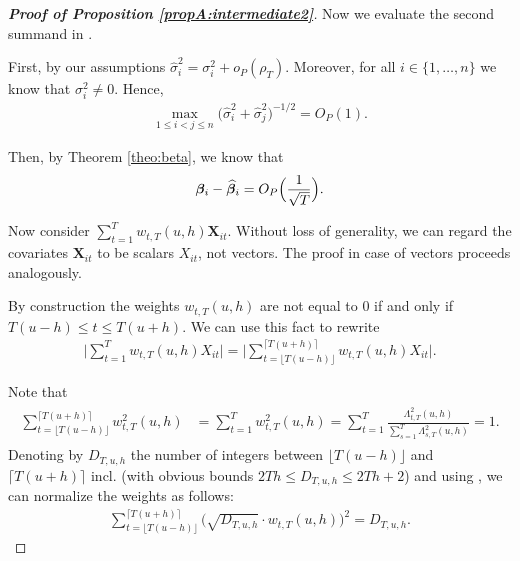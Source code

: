 \documentclass[a4paper,12pt]{article}
\makeatletter
\renewcommand{\eqref}[1]{\tagform@{\ref{#1}}}
\makeatother
\begin{document}
\begin{proof}[\textnormal{\textbf{Proof of Proposition \ref{propA:intermediate2}}}]
Now we evaluate the second summand in \eqref{ineq-diff-1}.

First, by our assumptions $\widehat{\sigma}_i^2 = \sigma_i^2 + o_P(\rho_T)$. Moreover, for all $i \in \{1, \ldots, n\}$ we know that $\sigma_i^2 \neq 0$. Hence, 
\begin{align}\label{ineq-diff-6}
\max_{1\le i < j \le n}\big(\widehat{\sigma}_i^2+ \widehat{\sigma}_j^2 \big)^{-1/2}  = O_P(1).
\end{align}

Then, by Theorem \ref{theo:beta}, we know that 
\begin{align}\label{ineq-diff-7}
\bm{\beta}_i - \widehat{\bm{\beta}}_i = O_P\Big(\frac{1}{\sqrt{T}}\Big).
\end{align}

Now consider $\sum_{t=1}^T w_{t,T}(u,h) \mathbf{X}_{it}$. Without loss of generality, we can regard the covariates $\mathbf{X}_{it}$ to be scalars $X_{it}$, not vectors. The proof in case of vectors proceeds analogously.

 
By construction the weights $w_{t, T}(u, h)$ are not equal to $0$ if and only if \linebreak $T(u-h) \le t \le T(u+h)$. We can use this fact to rewrite
\begin{align*}
\Big| \sum_{t=1}^T w_{t,T}(u,h) X_{it}   \Big|  = \bigg| \sum_{t=\lfloor T(u-h) \rfloor}^{\lceil T(u+h) \rceil} w_{t,T}(u,h)X_{it}   \bigg|.
\end{align*}

Note that
\begin{align}\label{eq:sum_weights}
\begin{split}
\sum_{t=\lfloor T(u-h) \rfloor}^{\lceil T(u+h) \rceil} w^2_{t,T}(u,h) &= \sum_{t=1}^T w^2_{t,T}(u,h) = \sum_{t=1}^T\frac{\Lambda^2_{t,T}(u,h)}{\sum\nolimits_{s=1}^T\Lambda^2_{s,T}(u,h) } = 1.
\end{split}
\end{align}
Denoting by $D_{T, u, h}$ the number of integers between $\lfloor T(u-h) \rfloor$ and $\lceil T(u+h) \rceil$ incl. (with obvious bounds $2Th \leq D_{T, u, h} \leq 2Th + 2$) and using \eqref{eq:sum_weights}, we can normalize the weights as follows:
\begin{align*}
\sum_{t=\lfloor T(u-h) \rfloor}^{\lceil T(u+h) \rceil} \big(\sqrt{D_{T, u, h}}\cdot w_{t,T}(u,h)\big)^2 = D_{T, u, h}.
\end{align*}


\end{proof}
\end{document}
